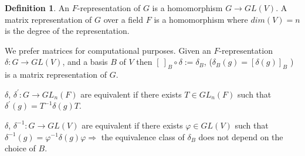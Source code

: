 \documentclass[12pt]{amsart}
\theoremstyle{definition}
\newtheorem{definition}[theorem]{Definition}
\begin{document}
\begin{definition}
An $F$-representation of $G$ is a homomorphism $G \rightarrow GL(V)$. A matrix representation of $G$ over a field $F$ is a homomorphism where $dim(V) = n$ is the degree of the representation.
\end{definition}

We prefer matrices for computational purposes. Given an $F$-representation $\delta: G \rightarrow GL(V)$, and a basis $B$ of $V$ then $[ \  ]_{B} \circ \delta := \delta_{B}$, ($ \delta_{B} (g) = \left[ \delta (g) \right]_{B}$ ) is a matrix representation of $G$.

$\delta$, $\delta^{'}: G \rightarrow GL_{n} (F)$ are equivalent if there exists $T \in GL_{n} (F)$ such that $\delta^{'} (g) = T^{- 1} \delta (g) T$.

$\delta$, $\delta^{- 1}: G \rightarrow GL(V)$ are equivalent if there exists $\varphi \in GL(V)$ such that $\delta^{- 1} (g) = \varphi^{- 1} \delta (g) \varphi \Rightarrow$ the equivalence class of $\delta_{B}$ does not depend on the choice of $B$.
\end{document}
